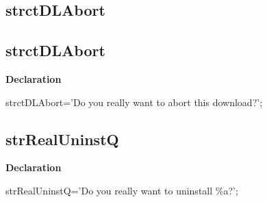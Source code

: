 \documentclass{report}
\newif\ifpdf
\begin{document}
\subsection*{\large{\textbf{strctDLAbort}}\normalsize\hspace{1ex}\hrulefill}
\else
\subsection*{strctDLAbort}
\fi
\label{trstrings-strctDLAbort}
\begin{list}{}{
\setlength{\itemindent}{0cm}
\setlength{\listparindent}{0cm}
\setlength{\leftmargin}{\evensidemargin}
\addtolength{\leftmargin}{\tmplength}
\settowidth{\labelsep}{X}
\addtolength{\leftmargin}{\labelsep}
\setlength{\labelwidth}{\tmplength}
}
\item[\textbf{Declaration}\hfill]
\ifpdf
\begin{flushleft}
\fi
\begin{ttfamily}
strctDLAbort='Do you really want to abort this download?';\end{ttfamily}

\ifpdf
\end{flushleft}
\fi

\end{list}
\ifpdf
\subsection*{\large{\textbf{strRealUninstQ}}\normalsize\hspace{1ex}\hrulefill}
\else
\subsection*{strRealUninstQ}
\fi
\label{trstrings-strRealUninstQ}
\begin{list}{}{
\setlength{\itemindent}{0cm}
\setlength{\listparindent}{0cm}
\setlength{\leftmargin}{\evensidemargin}
\addtolength{\leftmargin}{\tmplength}
\settowidth{\labelsep}{X}
\addtolength{\leftmargin}{\labelsep}
\setlength{\labelwidth}{\tmplength}
}
\item[\textbf{Declaration}\hfill]
\ifpdf
\begin{flushleft}
\fi
\begin{ttfamily}
strRealUninstQ='Do you really want to uninstall {\%}a?';\end{ttfamily}

\ifpdf
\end{flushleft}
\fi

\end{list}
\ifpdf
\end{document}
